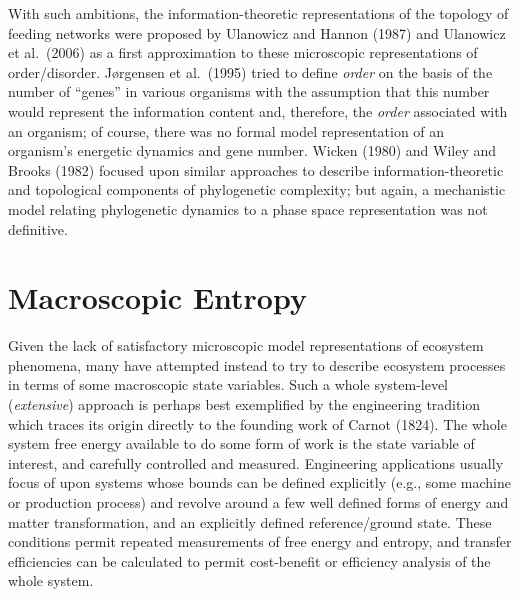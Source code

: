 \documentclass[11pt,letterpaper,]{paper}
\begin{document}
With such ambitions, the information-theoretic representations of the
topology of feeding networks were proposed by Ulanowicz and Hannon
(1987) and Ulanowicz et al.~(2006) as a first approximation to these
microscopic representations of order/disorder. Jørgensen et al.~(1995)
tried to define \emph{order} on the basis of the number of ``genes'' in
various organisms with the assumption that this number would represent
the information content and, therefore, the \emph{order} associated with
an organism; of course, there was no formal model representation of an
organism's energetic dynamics and gene number. Wicken (1980) and Wiley
and Brooks (1982) focused upon similar approaches to describe
information-theoretic and topological components of phylogenetic
complexity; but again, a mechanistic model relating phylogenetic
dynamics to a phase space representation was not definitive.

\section{Macroscopic Entropy}\label{macroscopic-entropy}

Given the lack of satisfactory microscopic model representations of
ecosystem phenomena, many have attempted instead to try to describe
ecosystem processes in terms of some macroscopic state variables. Such a
whole system-level (\emph{extensive}) approach is perhaps best
exemplified by the engineering tradition which traces its origin
directly to the founding work of Carnot (1824). The whole system free
energy available to do some form of work is the state variable of
interest, and carefully controlled and measured. Engineering
applications usually focus of upon systems whose bounds can be defined
explicitly (e.g., some machine or production process) and revolve around
a few well defined forms of energy and matter transformation, and an
explicitly defined reference/ground state. These conditions permit
repeated measurements of free energy and entropy, and transfer
efficiencies can be calculated to permit cost-benefit or efficiency
analysis of the whole system.
\end{document}
